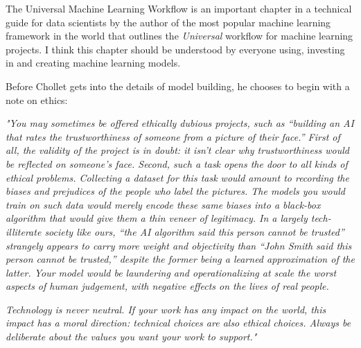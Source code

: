 The Universal Machine Learning Workflow is an important chapter in a technical guide for data scientists  by the author of the most popular machine learning framework in the world that outlines the \textit{Universal} workflow for machine learning projects. I think this chapter should be understood by everyone using, investing in and creating machine learning models. 

Before Chollet gets into the details of model building, he chooses to begin with a note on ethics: 

\textit{"You may sometimes be offered ethically dubious projects, such as “building an AI that rates the trustworthiness of someone from a picture of their face.” First of all, the validity of the project is in doubt: it isn’t clear why trustworthiness would be reflected on someone’s face. Second, such a task opens the door to all kinds of ethical problems. Collecting a dataset for this task would amount to recording the biases and prejudices of the people who label the pictures. The models you would train on such data would merely encode these same biases into a black-box algorithm that would give them a thin veneer of legitimacy. In a largely tech-illiterate society like ours, “the AI algorithm said this person cannot be trusted” strangely appears to carry more weight and objectivity than “John Smith said this person cannot be trusted,” despite the former being a learned approximation of the latter. Your model would be laundering and operationalizing at scale the worst aspects of human judgement, with negative effects on the lives of real people.}

\textit{Technology is never neutral. If your work has any impact on the world, this impact has a moral direction: technical choices are also ethical choices. Always be deliberate about the values you want your work to support."}\cite{chollet2022}

